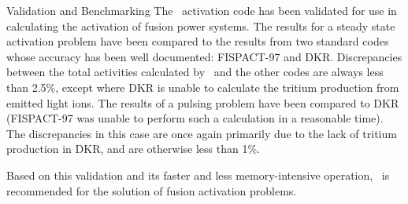 \begin{chapter}{Validation and Benchmarking}
The \ALARA\ activation code has been validated for use in calculating
the activation of fusion power systems.  The results for a steady
state activation problem have been compared to the results from two
standard codes whose accuracy has been well
documented\cite{bib:IAEA.bench2.rep}: FISPACT-97 and DKR.
Discrepancies between the total activities calculated by \ALARA\ and the
other codes are always less than 2.5\%, except where DKR is
unable to calculate the tritium production from emitted light ions.
The results of a pulsing problem have been compared to DKR
(FISPACT-97 was unable to perform such a calculation in a reasonable
time).  The discrepancies in this case are once again primarily due to
the lack of tritium production in DKR, and are otherwise less
than 1\%.

Based on this validation and its faster and less memory-intensive
operation, \ALARA\ is recommended for the solution of fusion activation
problems.


\end{chapter}